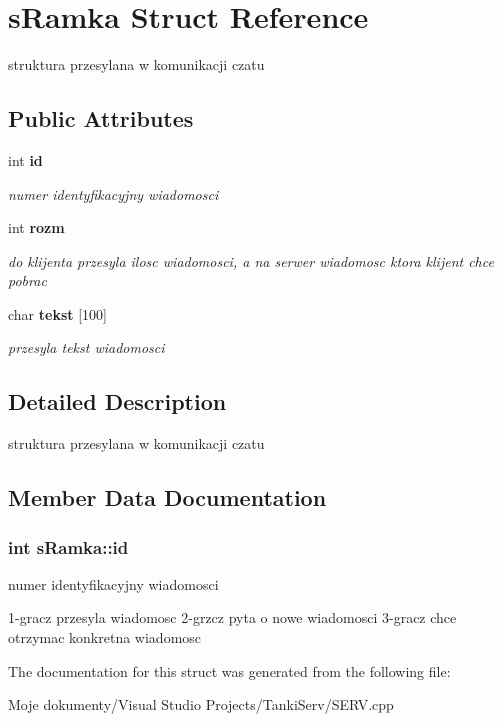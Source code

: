 \section{sRamka Struct Reference}
\label{structs_ramka}
struktura przesylana w komunikacji czatu  


\subsection*{Public Attributes}
\begin{CompactItemize}
\item 
int {\bf id}
\begin{CompactList}\small\item\em numer identyfikacyjny wiadomosci \item\end{CompactList}\item 
int {\bf rozm}\label{structs_ramka_699497d5716bc0c4efb8ff1cc5d1efbc}

\begin{CompactList}\small\item\em do klijenta przesyla ilosc wiadomosci, a na serwer wiadomosc ktora klijent chce pobrac \item\end{CompactList}\item 
char {\bf tekst} [100]\label{structs_ramka_19f50d72f991dbb04c2568ca21620126}

\begin{CompactList}\small\item\em przesyla tekst wiadomosci \item\end{CompactList}\end{CompactItemize}


\subsection{Detailed Description}
struktura przesylana w komunikacji czatu 



\subsection{Member Data Documentation}
\subsubsection{\setlength{\rightskip}{0pt plus 5cm}int {\bf sRamka::id}}\label{structs_ramka_5b01fac6b32934db9b735628cecd0094}


numer identyfikacyjny wiadomosci 

1-gracz przesyla wiadomosc 2-grzcz pyta o nowe wiadomosci 3-gracz chce otrzymac konkretna wiadomosc 

The documentation for this struct was generated from the following file:\begin{CompactItemize}
\item 
Moje dokumenty/Visual Studio Projects/TankiServ/SERV.cpp\end{CompactItemize}
